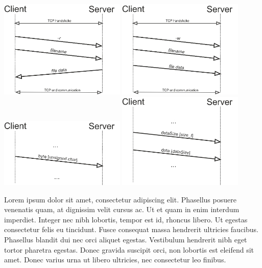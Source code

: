 \documentclass[10pt,a4paper,titlepage]{article}
\begin{document}
\begin{multicols}{2}
\includegraphics[width=0.45\textwidth]{read.png}
\includegraphics[width=0.45\textwidth]{write.png}
\includegraphics[width=0.45\textwidth]{send_byte.png}
\includegraphics[width=0.45\textwidth]{send_data.png}

\begin{justify}
Lorem ipsum dolor sit amet, consectetur adipiscing elit. Phasellus posuere venenatis quam,
at dignissim velit cursus ac. Ut et quam in enim interdum imperdiet. Integer nec nibh lobortis,
tempor est id, rhoncus libero. Ut egestas consectetur felis eu tincidunt. Fusce consequat massa
hendrerit ultricies faucibus. Phasellus blandit dui nec orci aliquet egestas. Vestibulum hendrerit
nibh eget tortor pharetra egestas. Donec gravida suscipit orci, non lobortis est eleifend sit amet.
Donec varius urna ut libero ultricies, nec consectetur leo finibus.
\end{justify}

\end{multicols}
\end{document}
